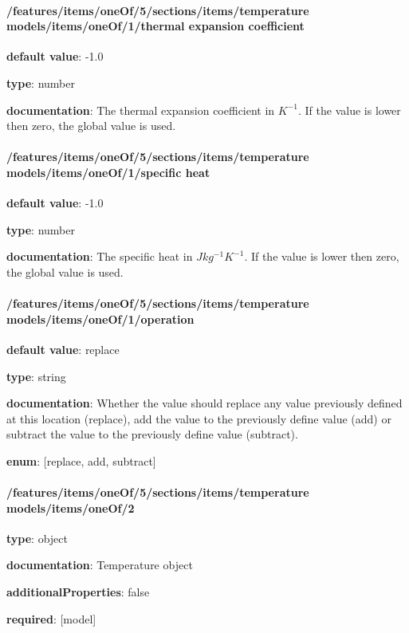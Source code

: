 \begin{itemized}
\end{itemized}\paragraph{/features/items/oneOf/5/sections/items/temperature models/items/oneOf/1/thermal expansion coefficient} \begin{itemized}
\item {\bf default value}: -1.0
\item {\bf type}: number
\item {\bf documentation}: The thermal expansion coefficient in $K^{-1}$. If the value is lower then zero, the global value is used.
\end{itemized}\paragraph{/features/items/oneOf/5/sections/items/temperature models/items/oneOf/1/specific heat} \begin{itemized}
\item {\bf default value}: -1.0
\item {\bf type}: number
\item {\bf documentation}: The specific heat in $J kg^{-1} K^{-1}$. If the value is lower then zero, the global value is used.
\end{itemized}\paragraph{/features/items/oneOf/5/sections/items/temperature models/items/oneOf/1/operation} \begin{itemized}
\item {\bf default value}: replace
\item {\bf type}: string
\item {\bf documentation}: Whether the value should replace any value previously defined at this location (replace), add the value to the previously define value (add) or subtract the value to the previously define value (subtract).
\item {\bf enum}: [replace, add, subtract]\end{itemized}\paragraph{/features/items/oneOf/5/sections/items/temperature models/items/oneOf/2} \begin{itemized}
\item {\bf type}: object
\item {\bf documentation}: Temperature object
\item {\bf additionalProperties}: false
\item {\bf required}: [model]\end{itemized}
